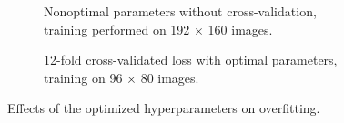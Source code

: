 \begin{figure}[H]
    \centering
    \begin{subfigure}{0.49\textwidth}
        \centering
        \caption{Nonoptimal parameters without cross-validation, training performed on 192 $\times$ 160 images.}
    \end{subfigure}
    \hfill
    \begin{subfigure}{0.49\textwidth}
        \centering
        \caption{12-fold cross-validated loss with optimal parameters, training on 96 $\times$ 80 images.}
        \label{fig:comp4b}
    \end{subfigure}
    \caption{Effects of the optimized hyperparameters on overfitting.}
    \label{fig:comp4}
\end{figure}
